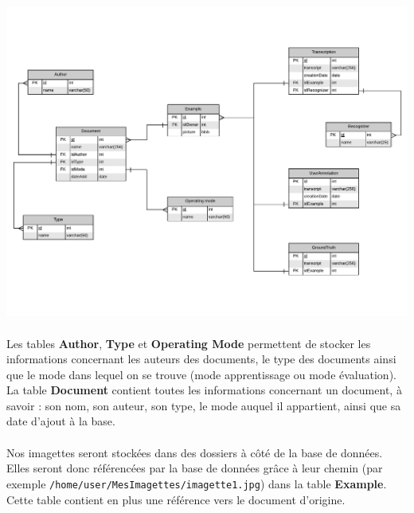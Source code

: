 \begin{mdframed}[frametitle={Figure 12 : Modèle entité association de la Base de données}, innerbottommargin=10]
\begin{center}
\includegraphics[scale=0.6]{Modele_entite_association.pdf}
\end{center}
\end{mdframed}

\paragraph{}

Les tables \textbf{Author}, \textbf{Type} et \textbf{Operating Mode} permettent
de stocker les informations concernant les auteurs des documents, le type des
documents ainsi que le mode dans lequel on se trouve (mode apprentissage ou
mode évaluation). La table \textbf{Document} contient toutes les informations
concernant un document, à savoir : son nom, son auteur, son type, le mode auquel
il appartient, ainsi que sa date d’ajout à la base.

\paragraph{}
Nos imagettes seront stockées dans des dossiers à côté de la base de données.
Elles seront donc référencées par la base de données grâce à leur chemin (par
exemple \texttt{/home/user/MesImagettes/imagette1.jpg}) dans la table
\textbf{Example}. Cette table contient en plus une référence vers le document
d’origine.

